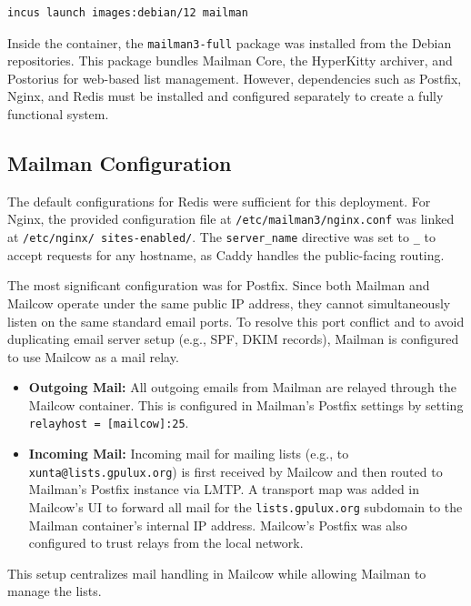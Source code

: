 \begin{lstlisting}[language=bash,caption={Command to create the Mailman container}]
incus launch images:debian/12 mailman
\end{lstlisting}

Inside the container, the \texttt{mailman3-full} package was installed from the Debian repositories. This package bundles Mailman Core, the HyperKitty archiver, and Postorius for web-based list management. However, dependencies such as Postfix, Nginx, and Redis must be installed and configured separately to create a fully functional system.

\subsection*{Mailman Configuration}

The default configurations for Redis were sufficient for this deployment. For Nginx, the provided configuration file at \texttt{/etc/mailman3/nginx.conf} was linked at \texttt{/etc/nginx/ sites-enabled/}. The \texttt{server\_name} directive was set to \texttt{\_} to accept requests for any hostname, as Caddy handles the public-facing routing.

The most significant configuration was for Postfix. Since both Mailman and Mailcow operate under the same public IP address, they cannot simultaneously listen on the same standard email ports. To resolve this port conflict and to avoid duplicating email server setup (e.g., SPF, DKIM records), Mailman is configured to use Mailcow as a mail relay.

\begin{itemize}
    \item \textbf{Outgoing Mail:} All outgoing emails from Mailman are relayed through the Mailcow container. This is configured in Mailman's Postfix settings by setting \texttt{relayhost = [mailcow]:25}.
    \item \textbf{Incoming Mail:} Incoming mail for mailing lists (e.g., to \texttt{xunta@lists.gpulux.org}) is first received by Mailcow and then routed to Mailman's Postfix instance via LMTP. A transport map was added in Mailcow's UI to forward all mail for the \texttt{lists.gpulux.org} subdomain to the Mailman container's internal IP address. Mailcow's Postfix was also configured to trust relays from the local network.
\end{itemize}

This setup centralizes mail handling in Mailcow while allowing Mailman to manage the lists.

